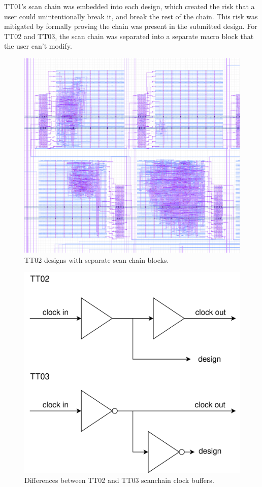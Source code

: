 TT01’s scan chain was embedded into each design, which created the risk that a user could unintentionally break it, and break the rest of the chain.
This risk was mitigated by formally\cite{tinytapeoutscan} proving the chain was present in the submitted design.
For TT02 and TT03, the scan chain was separated into a separate macro block that the user can’t modify.

\begin{figure}[htp]
\centering
\includegraphics[width=\columnwidth]{./Figs/tt02_gds_zoom.png}
\caption{TT02 designs with separate scan chain blocks.}
\label{fig:TT02_separate_scan_blocks}
\end{figure}

\begin{figure}[htp]
\centering
\includegraphics[width=\columnwidth]{./Figs/tt02 vs tt03 scanchain clock.png}
\caption{Differences between TT02 and TT03 scanchain clock buffers.}
\label{fig:TT02_vs_TT03}
\end{figure}

